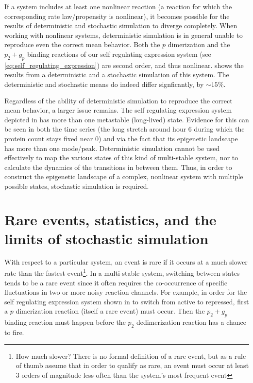 If a system includes at least one nonlinear reaction (\ie a reaction for which the corresponding rate law/propensity is nonlinear), it becomes possible for the results of deterministic and stochastic simulation to diverge completely. When working with nonlinear systems, deterministic simulation is in general unable to reproduce even the correct mean behavior\supercite{Hahl:2016ib}. Both the $p$ dimerization and the $p_{2} + g_{p}$ binding reactions of our self regulating expression system (see \eqref{eq:self_regulating_expression}) are second order, and thus nonlinear.  shows the results from a deterministic and a stochastic simulation of this system. The deterministic and stochastic means do indeed differ signficantly, by ${\sim} 15\%$.

Regardless of the ability of deterministic simulation to reproduce the correct mean behavior, a larger issue remains. The self regulating expression system depicted in  has more than one metastable (\ie long-lived) state. Evidence for this can be seen in both the time series (\eg the long stretch around hour 6 during which the protein count stays fixed near 0) and via the fact that its epigenetic landscape has more than one mode/peak. Deterministic simulation cannot be used effectively to map the various states of this kind of multi-stable system, nor to calculate the dynamics of the transitions in between them. Thus, in order to construct the epigenetic landscape of a complex, nonlinear system with multiple possible states, stochastic simulation is required.


\section{Rare events, statistics, and the limits of stochastic simulation}

With respect to a particular system, an event is rare\supercite{Baron:2017tf} if it occurs at a much slower rate than the fastest event\footnote{How much slower? There is no formal definition of a rare event, but as a rule of thumb assume that in order to qualify as rare, an event must occur at least 3 orders of magnitude less often than the system's most frequent event}. In a multi-stable system, switching between states tends to be a rare event since it often requires the co-occurrence of specific fluctuations in two or more noisy reaction channels. For example, in order for the self regulating expression system shown in  to switch from active to repressed, first a $p$ dimerization reaction (itself a rare event) must occur. Then the $p_{2} + g_{p}$ binding reaction must happen before the $p_{2}$ dedimerization reaction has a chance to fire.

